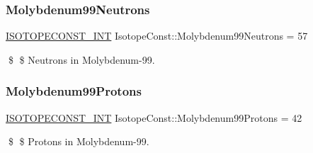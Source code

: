 \subsubsection{\texorpdfstring{Molybdenum99\+Neutrons}{Molybdenum99Neutrons}}
{\footnotesize\ttfamily \mbox{\hyperlink{group___isotope_const-_macros_ga5f18360b3e99483a35c32d789e62621c}{I\+S\+O\+T\+O\+P\+E\+C\+O\+N\+S\+T\+\_\+\+I\+NT}} Isotope\+Const\+::\+Molybdenum99\+Neutrons = 57}

\$ \$ Neutrons in Molybdenum-\/99. \mbox{\label{group___isotope_const-_molybdenum-_mo99_ga73722173d91d68fb217d8846501f4970}} 
\subsubsection{\texorpdfstring{Molybdenum99\+Protons}{Molybdenum99Protons}}
{\footnotesize\ttfamily \mbox{\hyperlink{group___isotope_const-_macros_ga5f18360b3e99483a35c32d789e62621c}{I\+S\+O\+T\+O\+P\+E\+C\+O\+N\+S\+T\+\_\+\+I\+NT}} Isotope\+Const\+::\+Molybdenum99\+Protons = 42}

\$ \$ Protons in Molybdenum-\/99. 